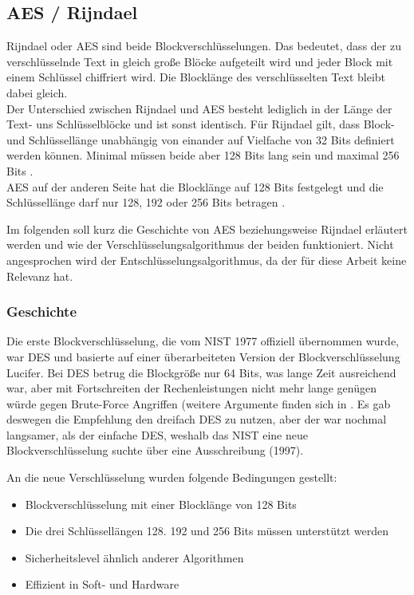 \subsection{AES / Rijndael}
\label{aes}
 Rijndael oder \ac{AES} sind beide Blockverschlüsselungen. Das bedeutet, dass der zu
 verschlüsselnde Text in gleich große Blöcke aufgeteilt wird und jeder Block mit einem Schlüssel
 chiffriert wird. Die Blocklänge des verschlüsselten Text bleibt dabei gleich. \\
 Der Unterschied zwischen Rijndael und AES besteht lediglich in der Länge der Text- uns
 Schlüsselblöcke und ist sonst identisch. Für Rijndael gilt, dass Block- und Schlüssellänge
 unabhängig von einander auf Vielfache von 32 Bits definiert werden können. Minimal müssen
 beide aber 128 Bits lang sein und maximal 256 Bits \cite{daemon02}. \\
 AES auf der anderen Seite hat die Blocklänge auf 128 Bits festgelegt und die Schlüssel\-länge
 darf nur 128, 192 oder 256 Bits betragen \cite{AES-FIPS}.
 
 Im folgenden soll kurz die Geschichte von AES beziehungsweise Rijndael erläutert werden und
 wie der Verschlüsselungs\-algorithmus der beiden funktioniert. Nicht angesprochen wird der
 Entschlüsselungs\-algorithmus, da der für diese Arbeit keine Relevanz hat.
 
 \subsubsection{Geschichte}
 \label{aes-geschichte}
 Die erste Blockverschlüsselung, die vom \ac{NIST} 1977 offiziell übernommen wurde, war
 \ac{DES} und basierte auf einer überarbeiteten Version der Blockverschlüsselung Lucifer. Bei
 DES betrug die Blockgröße nur 64 Bits, was lange Zeit ausreichend war, aber mit Fortschreiten
 der Rechenleistungen nicht mehr lange genügen würde gegen Brute-Force Angriffen (weitere
 Argumente finden sich in \cite{paar10}. Es gab deswegen die Empfehlung den dreifach DES zu
 nutzen, aber der war nochmal langsamer, als der einfache DES, weshalb das NIST eine neue
 Blockverschlüsselung suchte über eine Ausschreibung (1997).
 
 An die neue Verschlüsselung wurden folgende Bedingungen gestellt:
\begin{itemize}
 \item Blockverschlüsselung mit einer Blocklänge von 128 Bits
 \item Die drei Schlüssellängen 128. 192 und 256 Bits müssen unterstützt werden
 \item Sicherheitslevel ähnlich anderer Algorithmen
 \item Effizient in Soft- und Hardware
\end{itemize} 

